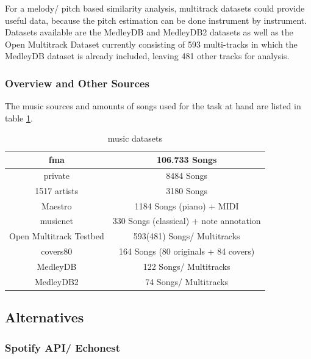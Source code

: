 For a melody/ pitch based similarity analysis, multitrack datasets could provide useful data, because the pitch estimation can be done instrument by instrument. 
Datasets available are the MedleyDB \cite{medleydb1} and MedleyDB2 \cite{medleydb2} datasets as well as the Open Multitrack Dataset \cite{openmult1} currently consisting of 593 multi-tracks in which the MedleyDB dataset is already included, leaving 481 other tracks for analysis.

\subsubsection{Overview and Other Sources}

The music sources and amounts of songs used for the task at hand are listed in table \ref{table_dsets}.

\begin{table}[h]
	\begin{center}
		\begin{tabular}{|c||c|}
			\hline
			fma & 106.733 Songs\\
			\hline
			private & 8484 Songs\\
			\hline
			1517 artists & 3180 Songs\\
			\hline
			Maestro & 1184 Songs (piano) + MIDI\\
			\hline
			musicnet & 330 Songs (classical) + note annotation\\
			\hline
			Open Multitrack Testbed & 593(481) Songs/ Multitracks\\
			\hline
			covers80 & 164 Songs (80 originals + 84 covers)\\
			\hline
			MedleyDB &  122 Songs/ Multitracks\\
			\hline
			MedleyDB2 &  74 Songs/ Multitracks\\
			\hline
		\end{tabular}
	\end{center}
	\caption{music datasets}
	\label{table_dsets}
\end{table}

\subsection{Alternatives}

\subsubsection{Spotify API/ Echonest}\label{spotipy}

